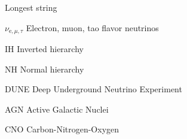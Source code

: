 
\begin{glossary}{Longest  string}
    
    \item[$\nu_{\mathrm e, \mu, \tau}$]
        Electron, muon, tao flavor neutrinos
    \item[IH]
        Inverted hierarchy
    \item[NH]
        Normal hierarchy
    \item[DUNE]
        Deep Underground Neutrino Experiment
    \item[AGN]
        Active Galactic Nuclei
    \item[CNO]
        Carbon-Nitrogen-Oxygen
\end{glossary}
